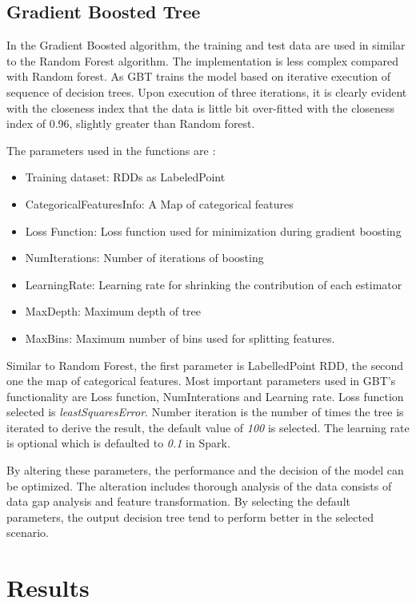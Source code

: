 \documentclass[sigconf]{acmart}
\begin{document}
\subsection{Gradient Boosted Tree}
In the Gradient Boosted algorithm, the training and test data are used in similar to the Random Forest algorithm. The implementation is less complex compared with Random forest. As GBT trains the model based on iterative execution of sequence of decision trees. Upon execution of three iterations, it is clearly evident with the closeness index that the data is little bit over-fitted with the closeness index of 0.96, slightly greater than Random forest.

The parameters used in the functions are \cite{api:docs} : 
\begin{itemize}
\item Training dataset: RDDs as LabeledPoint
\item CategoricalFeaturesInfo: A Map of categorical features
\item Loss Function: Loss function used for minimization during gradient boosting
\item NumIterations: Number of iterations of boosting
\item LearningRate: Learning rate for shrinking the contribution of each estimator
\item MaxDepth: Maximum depth of tree 
\item MaxBins: Maximum number of bins used for splitting features.
\end{itemize}

Similar to Random Forest, the first parameter is LabelledPoint RDD,
the second one the map of categorical features. Most important parameters used in GBT's functionality are Loss function, NumInterations and Learning rate. Loss function selected is {\em leastSquaresError}. Number iteration is the number of times the tree is iterated to derive the result, the default value of {\em 100} is selected. The learning rate is optional which is defaulted to {\em 0.1} in Spark.

By altering these parameters, the performance and the decision of the model can be optimized. The alteration includes thorough analysis of the data consists of data gap analysis and feature transformation.
By selecting the default parameters, the output decision tree tend to perform better in the selected scenario.

\section{Results}
\end{document}
